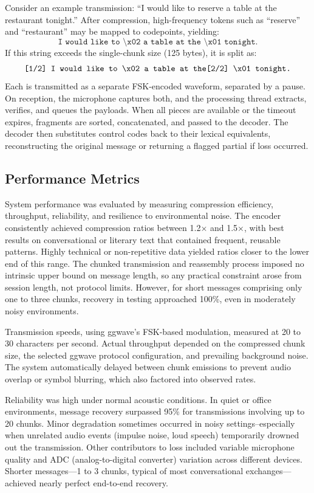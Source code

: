 \documentclass[12pt,openany]{article}
\theoremstyle{definition}
\theoremstyle{definition}
\theoremstyle{definition}
\begin{document}
Consider an example transmission: “I would like to reserve a table at the restaurant tonight.” After compression, high-frequency tokens such as “reserve” and “restaurant” may be mapped to codepoints, yielding:
\[
\texttt{I would like to \textbackslash x02 a table at the \textbackslash x01 tonight.}
\]
If this string exceeds the single-chunk size (125 bytes), it is split as:
\[
\texttt{[1/2] I would like to \textbackslash x02 a table at the} \\
\texttt{[2/2] \textbackslash x01 tonight.}
\]
Each is transmitted as a separate FSK-encoded waveform, separated by a pause. On reception, the microphone captures both, and the processing thread extracts, verifies, and queues the payloads. When all pieces are available or the timeout expires, fragments are sorted, concatenated, and passed to the decoder. The decoder then substitutes control codes back to their lexical equivalents, reconstructing the original message or returning a flagged partial if loss occurred.

\subsection*{Performance Metrics}
System performance was evaluated by measuring compression efficiency, throughput, reliability, and resilience to environmental noise. The encoder consistently achieved compression ratios between 1.2× and 1.5×, with best results on conversational or literary text that contained frequent, reusable patterns. Highly technical or non-repetitive data yielded ratios closer to the lower end of this range. The chunked transmission and reassembly process imposed no intrinsic upper bound on message length, so any practical constraint arose from session length, not protocol limits. However, for short messages comprising only one to three chunks, recovery in testing approached 100\%, even in moderately noisy environments.

Transmission speeds, using ggwave’s FSK-based modulation, measured at 20 to 30 characters per second. Actual throughput depended on the compressed chunk size, the selected ggwave protocol configuration, and prevailing background noise. The system automatically delayed between chunk emissions to prevent audio overlap or symbol blurring, which also factored into observed rates.

Reliability was high under normal acoustic conditions. In quiet or office environments, message recovery surpassed 95\% for transmissions involving up to 20 chunks. Minor degradation sometimes occurred in noisy settings–especially when unrelated audio events (impulse noise, loud speech) temporarily drowned out the transmission. Other contributors to loss included variable microphone quality and ADC (analog-to-digital converter) variation across different devices. Shorter messages—1 to 3 chunks, typical of most conversational exchanges—achieved nearly perfect end-to-end recovery.
\end{document}
